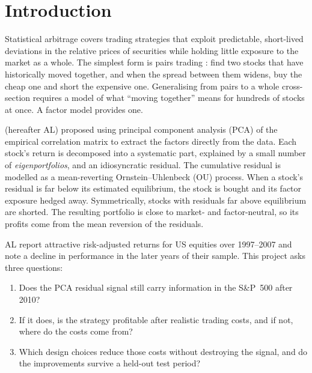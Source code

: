 \section{Introduction}
\label{sec:intro}

Statistical arbitrage covers trading strategies that exploit predictable, short-lived
deviations in the relative prices of securities while holding little exposure to the market
as a whole. The simplest form is pairs trading \citep{gatev2006}: find two stocks that have
historically moved together, and when the spread between them widens, buy the cheap one and
short the expensive one. Generalising from pairs to a whole cross-section requires a model of
what ``moving together'' means for hundreds of stocks at once. A factor model provides one.

\citet{avellaneda2010} (hereafter AL) proposed using principal component analysis (PCA) of the
empirical correlation matrix to extract the factors directly from the data. Each stock's return
is decomposed into a systematic part, explained by a small number of \emph{eigenportfolios},
and an idiosyncratic residual. The cumulative residual is modelled as a mean-reverting
Ornstein--Uhlenbeck (OU) process. When a stock's residual is far below its estimated
equilibrium, the stock is bought and its factor exposure hedged away. Symmetrically, stocks with
residuals far above equilibrium are shorted. The resulting portfolio is close to market- and
factor-neutral, so its profits come from the mean reversion of the residuals.

AL report attractive risk-adjusted returns for US equities over 1997--2007 and note a decline in
performance in the later years of their sample. This project asks three questions:
\begin{enumerate}
  \item Does the PCA residual signal still carry information in the S\&P~500 after 2010?
  \item If it does, is the strategy profitable after realistic trading costs, and if not, where
        do the costs come from?
  \item Which design choices reduce those costs without destroying the signal, and do the
        improvements survive a held-out test period?
\end{enumerate}

